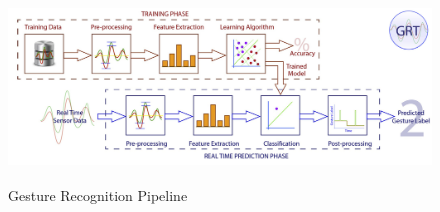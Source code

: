 \begin{figure}
	[h] \centering 
	\includegraphics[height=5cm]{figures/content/grt-pipeline.jpg} \caption{Gesture Recognition Pipeline} \label{fg:grt:pipeline} 
\end{figure}
